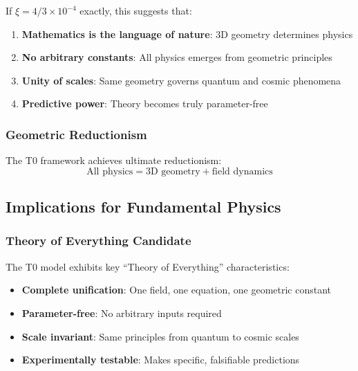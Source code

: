 	If $\xi = 4/3 \times 10^{-4}$ exactly, this suggests that:
	
	\begin{enumerate}
		\item \textbf{Mathematics is the language of nature}: 3D geometry determines physics
		\item \textbf{No arbitrary constants}: All physics emerges from geometric principles
		\item \textbf{Unity of scales}: Same geometry governs quantum and cosmic phenomena
		\item \textbf{Predictive power}: Theory becomes truly parameter-free
	\end{enumerate}
	
	\subsubsection{Geometric Reductionism}
	\label{subsubsec:geometric_reductionism}
	
	The T0 framework achieves ultimate reductionism:
	\begin{equation}
		\boxed{\text{All physics} = \text{3D geometry} + \text{field dynamics}}
		\label{eq:ultimate_reductionism}
	\end{equation}
	
	\subsection{Implications for Fundamental Physics}
	\label{subsec:fundamental_physics}
	
	\subsubsection{Theory of Everything Candidate}
	\label{subsubsec:toe_candidate}
	
	The T0 model exhibits key ``Theory of Everything'' characteristics:
	\begin{itemize}
		\item \textbf{Complete unification}: One field, one equation, one geometric constant
		\item \textbf{Parameter-free}: No arbitrary inputs required
		\item \textbf{Scale invariant}: Same principles from quantum to cosmic scales
		\item \textbf{Experimentally testable}: Makes specific, falsifiable predictions
	\end{itemize}

